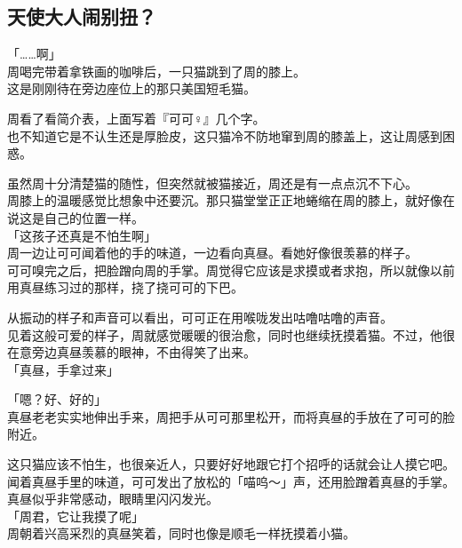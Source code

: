 \subsection{天使大人闹别扭？}

「……啊」\\

周喝完带着拿铁画的咖啡后，一只猫跳到了周的膝上。\\

这是刚刚待在旁边座位上的那只美国短毛猫。

周看了看简介表，上面写着『可可♀』几个字。\\

也不知道它是不认生还是厚脸皮，这只猫冷不防地窜到周的膝盖上，这让周感到困惑。

虽然周十分清楚猫的随性，但突然就被猫接近，周还是有一点点沉不下心。\\

周膝上的温暖感觉比想象中还要沉。那只猫堂堂正正地蜷缩在周的膝上，就好像在说这是自己的位置一样。\\

「这孩子还真是不怕生啊」\\

周一边让可可闻着他的手的味道，一边看向真昼。看她好像很羡慕的样子。\\

可可嗅完之后，把脸蹭向周的手掌。周觉得它应该是求摸或者求抱，所以就像以前用真昼练习过的那样，挠了挠可可的下巴。

从振动的样子和声音可以看出，可可正在用喉咙发出咕噜咕噜的声音。\\

见着这般可爱的样子，周就感觉暖暖的很治愈，同时也继续抚摸着猫。不过，他很在意旁边真昼羡慕的眼神，不由得笑了出来。\\

「真昼，手拿过来」

「嗯？好、好的」\\

真昼老老实实地伸出手来，周把手从可可那里松开，而将真昼的手放在了可可的脸附近。

这只猫应该不怕生，也很亲近人，只要好好地跟它打个招呼的话就会让人摸它吧。\\

闻着真昼手里的味道，可可发出了放松的「喵呜～」声，还用脸蹭着真昼的手掌。真昼似乎非常感动，眼睛里闪闪发光。\\

「周君，它让我摸了呢」\\

周朝着兴高采烈的真昼笑着，同时也像是顺毛一样抚摸着小猫。

